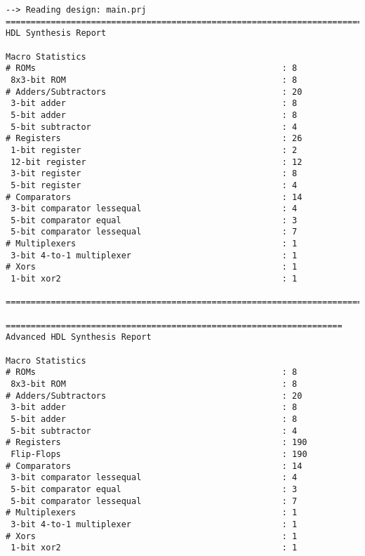 \documentclass[14pt]{report}
\begin{document}
{\begin{verbatim}
--> Reading design: main.prj
=========================================================================
HDL Synthesis Report

Macro Statistics
# ROMs                                                 : 8
 8x3-bit ROM                                           : 8
# Adders/Subtractors                                   : 20
 3-bit adder                                           : 8
 5-bit adder                                           : 8
 5-bit subtractor                                      : 4
# Registers                                            : 26
 1-bit register                                        : 2
 12-bit register                                       : 12
 3-bit register                                        : 8
 5-bit register                                        : 4
# Comparators                                          : 14
 3-bit comparator lessequal                            : 4
 5-bit comparator equal                                : 3
 5-bit comparator lessequal                            : 7
# Multiplexers                                         : 1
 3-bit 4-to-1 multiplexer                              : 1
# Xors                                                 : 1
 1-bit xor2                                            : 1

=========================================================================

===================================================================
Advanced HDL Synthesis Report

Macro Statistics
# ROMs                                                 : 8
 8x3-bit ROM                                           : 8
# Adders/Subtractors                                   : 20
 3-bit adder                                           : 8
 5-bit adder                                           : 8
 5-bit subtractor                                      : 4
# Registers                                            : 190
 Flip-Flops                                            : 190
# Comparators                                          : 14
 3-bit comparator lessequal                            : 4
 5-bit comparator equal                                : 3
 5-bit comparator lessequal                            : 7
# Multiplexers                                         : 1
 3-bit 4-to-1 multiplexer                              : 1
# Xors                                                 : 1
 1-bit xor2                                            : 1


\end{verbatim}}
\end{document}
